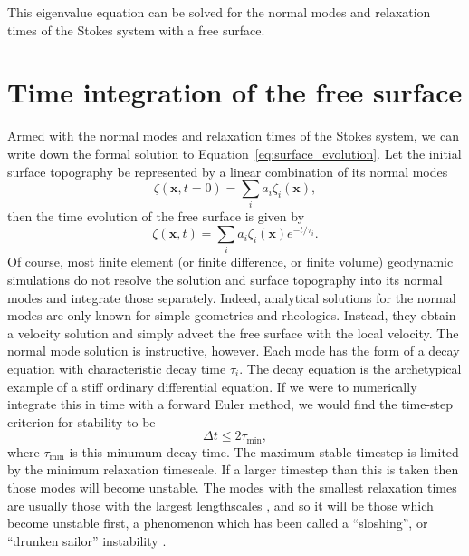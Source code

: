 \documentclass[preprint,12pt,authoryear]{elsarticle}
\begin{document}
This eigenvalue equation can be solved for the normal modes and relaxation times of the Stokes system with 
a free surface.

\section{Time integration of the free surface}
\label{sec:timestepping}

Armed with the normal modes and relaxation times of the Stokes system, we can write down the
formal solution to Equation~\eqref{eq:surface_evolution}. Let the initial surface topography be 
represented by a linear combination of its normal modes
\begin{equation}
\zeta(\mathbf{x}, t=0) = \displaystyle \sum_i a_i \zeta_i(\mathbf{x}),
\end{equation}
then the time evolution of the free surface is given by
\begin{equation}
\zeta( \mathbf{x}, t) = \displaystyle \sum_i a_i \zeta_i(\mathbf{x}) e^{-t/\tau_i}.
\end{equation}
Of course, most finite element (or finite difference, or finite volume) geodynamic simulations do not resolve 
the solution and surface topography into its normal modes and integrate those separately. 
Indeed, analytical solutions for the normal modes are only known for simple geometries and rheologies.
Instead, they obtain a velocity solution and simply advect the free surface with the local velocity.
The normal mode solution is instructive, however. 
Each mode has the form of a decay equation with characteristic decay time $\tau_i$.
The decay equation is the archetypical example of a stiff ordinary differential equation.
If we were to numerically integrate this in time with a forward Euler method, we would find the 
time-step criterion for stability \citep[e.g.][]{leveque2007finite} to be
\begin{equation}
\Delta t  \le 2 \tau_{\mathrm{min}},
\label{eq:cfl_euler}
\end{equation}
where $\tau_{\mathrm{min}}$ is this minumum decay time.
The maximum stable timestep is limited by the minimum relaxation timescale.
If a larger timestep than this is taken then those modes will become unstable.
The modes with the smallest relaxation times are usually those with the largest lengthscales \citep{schubert2001mantle}, 
and so it will be those which become unstable first, a phenomenon which has been called 
a ``sloshing'', or ``drunken sailor'' instability \citep{kaus2010stabilization}.
\end{document}

